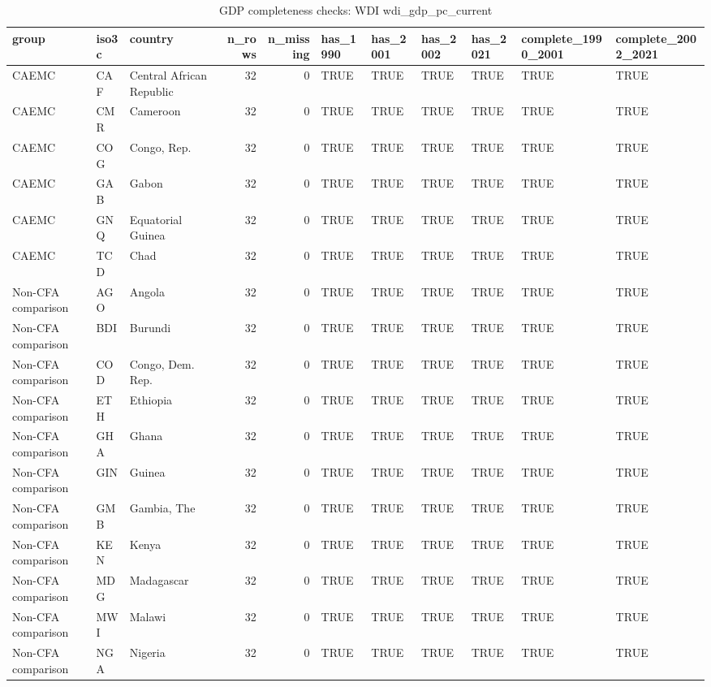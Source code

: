 \begin{table}

\caption{GDP completeness checks: WDI wdi_gdp_pc_current}
\centering
\begin{tabular}[t]{lllrrllllll}
\toprule
group & iso3c & country & n\_rows & n\_missing & has\_1990 & has\_2001 & has\_2002 & has\_2021 & complete\_1990\_2001 & complete\_2002\_2021\\
\midrule
CAEMC & CAF & Central African Republic & 32 & 0 & TRUE & TRUE & TRUE & TRUE & TRUE & TRUE\\
CAEMC & CMR & Cameroon & 32 & 0 & TRUE & TRUE & TRUE & TRUE & TRUE & TRUE\\
CAEMC & COG & Congo, Rep. & 32 & 0 & TRUE & TRUE & TRUE & TRUE & TRUE & TRUE\\
CAEMC & GAB & Gabon & 32 & 0 & TRUE & TRUE & TRUE & TRUE & TRUE & TRUE\\
CAEMC & GNQ & Equatorial Guinea & 32 & 0 & TRUE & TRUE & TRUE & TRUE & TRUE & TRUE\\
\addlinespace
CAEMC & TCD & Chad & 32 & 0 & TRUE & TRUE & TRUE & TRUE & TRUE & TRUE\\
Non-CFA comparison & AGO & Angola & 32 & 0 & TRUE & TRUE & TRUE & TRUE & TRUE & TRUE\\
Non-CFA comparison & BDI & Burundi & 32 & 0 & TRUE & TRUE & TRUE & TRUE & TRUE & TRUE\\
Non-CFA comparison & COD & Congo, Dem. Rep. & 32 & 0 & TRUE & TRUE & TRUE & TRUE & TRUE & TRUE\\
Non-CFA comparison & ETH & Ethiopia & 32 & 0 & TRUE & TRUE & TRUE & TRUE & TRUE & TRUE\\
\addlinespace
Non-CFA comparison & GHA & Ghana & 32 & 0 & TRUE & TRUE & TRUE & TRUE & TRUE & TRUE\\
Non-CFA comparison & GIN & Guinea & 32 & 0 & TRUE & TRUE & TRUE & TRUE & TRUE & TRUE\\
Non-CFA comparison & GMB & Gambia, The & 32 & 0 & TRUE & TRUE & TRUE & TRUE & TRUE & TRUE\\
Non-CFA comparison & KEN & Kenya & 32 & 0 & TRUE & TRUE & TRUE & TRUE & TRUE & TRUE\\
Non-CFA comparison & MDG & Madagascar & 32 & 0 & TRUE & TRUE & TRUE & TRUE & TRUE & TRUE\\
\addlinespace
Non-CFA comparison & MWI & Malawi & 32 & 0 & TRUE & TRUE & TRUE & TRUE & TRUE & TRUE\\
Non-CFA comparison & NGA & Nigeria & 32 & 0 & TRUE & TRUE & TRUE & TRUE & TRUE & TRUE\\

\end{tabular}
\end{table}
